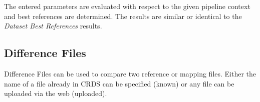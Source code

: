 \documentclass[letterpaper,10pt,english]{sphinxmanual}
\begin{document}
The entered parameters are evaluated with respect to the given pipeline context
and best references are determined.   The results are similar or identical to
the \emph{Dataset Best References} results.


\subsection{Difference Files}
\label{web_site_use:difference-files}
Difference Files can be used to compare two reference or mapping files.   Either
the name of a file already in CRDS can be specified (known) or any file can be
uploaded via the web (uploaded).
\begin{figure}[htbp]
\centering

\end{figure}
\end{document}
